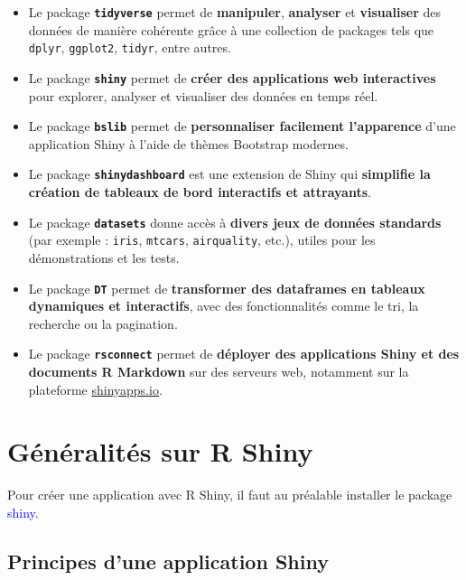 \documentclass[
]{article}
\providecommand{\tightlist}{%
  \setlength{\itemsep}{0pt}\setlength{\parskip}{0pt}}
\begin{document}
\begin{itemize}
\tightlist
\item
  Le package \textbf{\texttt{tidyverse}} permet de \textbf{manipuler},
  \textbf{analyser} et \textbf{visualiser} des données de manière
  cohérente grâce à une collection de packages tels que \texttt{dplyr},
  \texttt{ggplot2}, \texttt{tidyr}, entre autres.\\
\item
  Le package \textbf{\texttt{shiny}} permet de \textbf{créer des
  applications web interactives} pour explorer, analyser et visualiser
  des données en temps réel.\\
\item
  Le package \textbf{\texttt{bslib}} permet de \textbf{personnaliser
  facilement l'apparence} d'une application Shiny à l'aide de thèmes
  Bootstrap modernes.\\
\item
  Le package \textbf{\texttt{shinydashboard}} est une extension de Shiny
  qui \textbf{simplifie la création de tableaux de bord interactifs et
  attrayants}.\\
\item
  Le package \textbf{\texttt{datasets}} donne accès à \textbf{divers
  jeux de données standards} (par exemple : \texttt{iris},
  \texttt{mtcars}, \texttt{airquality}, etc.), utiles pour les
  démonstrations et les tests.\\
\item
  Le package \textbf{\texttt{DT}} permet de \textbf{transformer des
  dataframes en tableaux dynamiques et interactifs}, avec des
  fonctionnalités comme le tri, la recherche ou la pagination.\\
\item
  Le package \textbf{\texttt{rsconnect}} permet de \textbf{déployer des
  applications Shiny et des documents R Markdown} sur des serveurs web,
  notamment sur la plateforme
  \href{https://www.shinyapps.io}{shinyapps.io}.
\end{itemize}

\section{Généralités sur R
Shiny}\label{guxe9nuxe9ralituxe9s-sur-r-shiny}

Pour créer une application avec R Shiny, il faut au préalable installer
le package \textcolor{blue}{shiny.}

\subsection{Principes d'une application
Shiny}\label{principes-dune-application-shiny}
\end{document}

